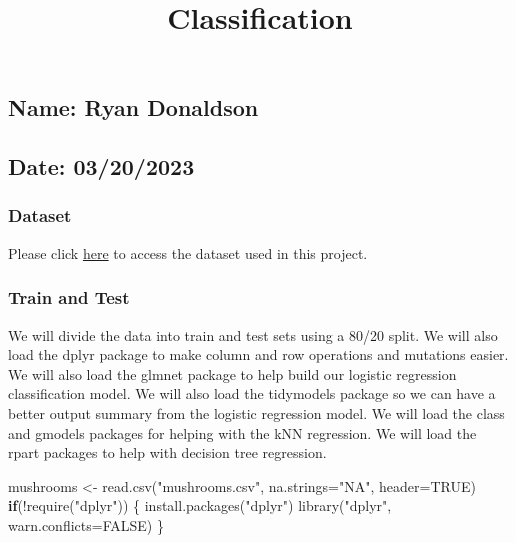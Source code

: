 \documentclass[
]{article}
\title{Classification}
\author{}
\date{\vspace{-2.5em}}
\newenvironment{Shaded}{\begin{snugshade}}{\end{snugshade}}
\newcommand{\AttributeTok}[1]{\textcolor[rgb]{0.77,0.63,0.00}{#1}}
\newcommand{\ConstantTok}[1]{\textcolor[rgb]{0.00,0.00,0.00}{#1}}
\newcommand{\ControlFlowTok}[1]{\textcolor[rgb]{0.13,0.29,0.53}{\textbf{#1}}}
\newcommand{\FunctionTok}[1]{\textcolor[rgb]{0.00,0.00,0.00}{#1}}
\newcommand{\NormalTok}[1]{#1}
\newcommand{\OtherTok}[1]{\textcolor[rgb]{0.56,0.35,0.01}{#1}}
\newcommand{\SpecialCharTok}[1]{\textcolor[rgb]{0.00,0.00,0.00}{#1}}
\newcommand{\StringTok}[1]{\textcolor[rgb]{0.31,0.60,0.02}{#1}}
\begin{document}
\maketitle

\hypertarget{name-ryan-donaldson}{%
\subsection{Name: Ryan Donaldson}\label{name-ryan-donaldson}}

\hypertarget{date-03202023}{%
\subsection{Date: 03/20/2023}\label{date-03202023}}

\hypertarget{dataset}{%
\subsubsection{Dataset}\label{dataset}}

Please click
\href{https://www.kaggle.com/datasets/uciml/mushroom-classification}{here}
to access the dataset used in this project.

\hypertarget{train-and-test}{%
\subsubsection{Train and Test}\label{train-and-test}}

We will divide the data into train and test sets using a 80/20 split. We
will also load the dplyr package to make column and row operations and
mutations easier. We will also load the glmnet package to help build our
logistic regression classification model. We will also load the
tidymodels package so we can have a better output summary from the
logistic regression model. We will load the class and gmodels packages
for helping with the kNN regression. We will load the rpart packages to
help with decision tree regression.

\begin{Shaded}
\begin{Highlighting}[]
\NormalTok{mushrooms }\OtherTok{\textless{}{-}} \FunctionTok{read.csv}\NormalTok{(}\StringTok{"mushrooms.csv"}\NormalTok{, }\AttributeTok{na.strings=}\StringTok{"NA"}\NormalTok{, }\AttributeTok{header=}\ConstantTok{TRUE}\NormalTok{)}
\ControlFlowTok{if}\NormalTok{(}\SpecialCharTok{!}\FunctionTok{require}\NormalTok{(}\StringTok{"dplyr"}\NormalTok{)) \{}
  \FunctionTok{install.packages}\NormalTok{(}\StringTok{"dplyr"}\NormalTok{)}
  \FunctionTok{library}\NormalTok{(}\StringTok{"dplyr"}\NormalTok{, }\AttributeTok{warn.conflicts=}\ConstantTok{FALSE}\NormalTok{)}
\NormalTok{\}}
\end{Highlighting}
\end{Shaded}
\end{document}
